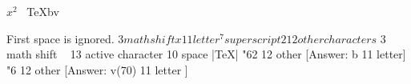  $x^2$~ \TeX ^^62^^6

First space is ignored.
$ 3 math shift
x 11 letter
^ 7 superscript
2 12 other characters
$ 3 math shift
~ 13 active character
  10 space
|TeX|
"62 12 other [Answer: b 11 letter]
"6 12 other [Answer: v(70) 11 letter ]


\bye

